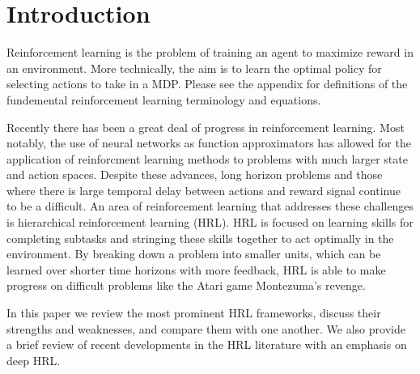 \section{Introduction}
Reinforcement learning is the problem of training an agent to maximize reward in an environment.
More technically, the aim is to learn the optimal policy for selecting actions to take in a MDP.
Please see the appendix for definitions of the fundemental reinforcement learning terminology
and equations.

Recently there has been a great deal of progress in reinforcement learning. Most notably,
the use of neural networks as function approximators has allowed for the application of
reinforcment learning methods to problems with much larger state and action spaces.
Despite these advances, long horizon problems  and those where there is large temporal delay between actions and reward signal continue to be a difficult.
An area of reinforcement learning that addresses these challenges is hierarchical reinforcement learning (HRL).
HRL is focused on learning skills for completing subtasks and stringing these skills
together to act optimally in the environment. By breaking down a problem into smaller units, which can be learned
over shorter time horizons with more feedback, HRL is able to make progress on difficult
problems like the Atari game Montezuma's revenge.

In this paper we review the most prominent HRL frameworks, discuss their strengths and
weaknesses, and compare them with one another. We also provide a brief review of recent developments in the
HRL literature with an emphasis on deep HRL.

